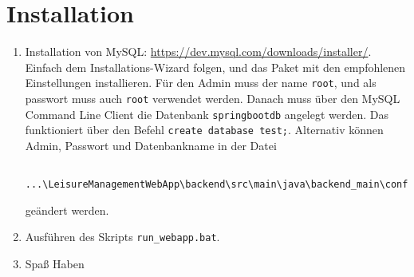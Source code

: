 \section{Installation}

\begin{enumerate}
	\item Installation von MySQL: \url{https://dev.mysql.com/downloads/installer/}. Einfach dem Installations-Wizard folgen, und das Paket mit den empfohlenen Einstellungen installieren. Für den Admin muss der name \verb|root|, und als passwort muss auch \verb|root| verwendet werden. Danach muss über den MySQL Command Line Client die Datenbank \verb|springbootdb| angelegt werden. Das funktioniert über den Befehl \verb|create database test;|. Alternativ können Admin, Passwort und Datenbankname in der Datei 
	\begin{lstlisting}
		...\LeisureManagementWebApp\backend\src\main\java\backend_main\configuration\PersistenceConfiguration.java
	\end{lstlisting}
	geändert werden.
	\item Ausführen des Skripts \verb|run_webapp.bat|.
	\item Spaß Haben 
\end{enumerate}